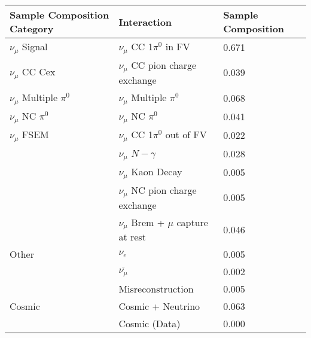 \begin{table}[H]
\centering
{}
 \begin{tabular}{|l|l|l|}
 \hline
Sample Composition Category & Interaction & Sample Composition \\ [0.1ex] \hline
$\nu_\mu$ Signal & $\nu_\mu$ CC 1$\pi^0$ in FV & 0.671 \\ \hline
$\nu_\mu$ CC Cex & $\nu_\mu$ CC pion charge exchange & 0.039 \\ \hline
$\nu_\mu$ Multiple $\pi^0$ & $\nu_\mu$ Multiple $\pi^0$ & 0.068 \\ \hline
$\nu_\mu$ NC $\pi^0$ & $\nu_\mu$ NC $\pi^0$ & 0.041 \\ \hline
$\nu_\mu$ FSEM & $\nu_\mu$ CC 1$\pi^0$ out of FV & 0.022 \\
& $\nu_\mu$ $N-\gamma$ & 0.028 \\
& $\nu_\mu$ Kaon Decay & 0.005 \\
& $\nu_\mu$ NC pion charge exchange & 0.005 \\ 
&$\nu_\mu$ Brem + $\mu$ capture at rest & 0.046 \\ \hline
Other & $\nu_e$ &0.005 \\
&$\overline{\nu_\mu}$ & 0.002 \\
& Misreconstruction & 0.005 \\ \hline
Cosmic & Cosmic + Neutrino& 0.063 \\
& Cosmic (Data) & 0.000 \\ \hline
\end{tabular}
\end{table}


